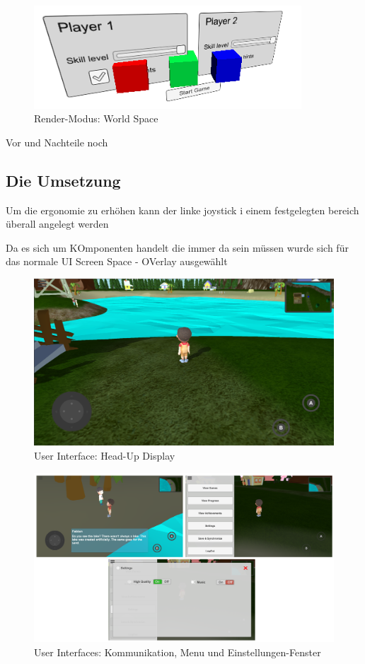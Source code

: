 			\begin{figure}[htbp]
				\centering 
				\label{renderWorldSpace}
				\includegraphics[width=10cm]{pics/CanvasWorldSpace.png}
				\caption{Render-Modus: World Space}
			\end{figure}
		
			Vor und Nachteile noch
			
	\subsection{Die Umsetzung}	
		Um die ergonomie zu erhöhen kann der linke joystick i einem festgelegten bereich überall angelegt werden
		
		Da es sich um KOmponenten handelt die immer da sein müssen wurde sich für das normale UI Screen Space - OVerlay ausgewählt
		
		\begin{figure}[htbp]
			\centering 
			\label{alwaysOnUI}
			\includegraphics[width=13cm]{pics/alwaysOnUI.png}
			\caption{User Interface: Head-Up Display}
		\end{figure}
	
		\begin{figure}[htbp]
			\centering 
			\label{userInterfaces}
			\includegraphics[width=\textwidth]{pics/userInterface.png}
			\caption{User Interfaces: Kommunikation, Menu und Einstellungen-Fenster}
		\end{figure}
	
